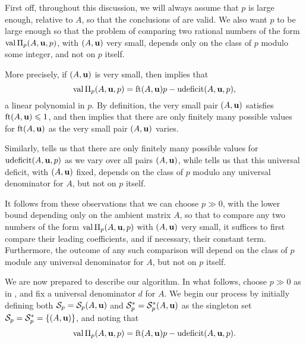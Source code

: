 \documentclass[11pt]{amsart}
\newcommand{\udeficit}{\operatorname{udeficit}}
\newcommand{\denom}{d}
\renewcommand{\S}{\mathcal{S}}
\begin{document}
\begin{remark}
   \label{p large m-primary: R}
   First off, throughout this discussion, we will always assume that $p$ is large enough, relative to $A$, so that the conclusions of  are valid.
   We also want $p$ to be large enough so that the problem of comparing two rational numbers of the form $\operatorname{val} \Pi_p(A,\mathbf{u},p)$, with $(A,\mathbf{u})$ very small, depends only on the class of $p$ modulo some integer, and not on $p$ itself.

   More precisely, if $(A,\mathbf{u})$ is very small, then   implies that
   \[ \val \IP_p(A,\vv{u},p) = \ft{A}{\vv{u}}p-\udeficit(A,\vv{u},p), \]
   a linear polynomial in $p$.
   By definition, the very small pair $(A,\mathbf{u})$ satisfies $\operatorname{ft}(A, \mathbf{u}) \leqslant 1$, and  then implies that there are only finitely many possible values for $\operatorname{ft}(A, \mathbf{u})$ as the very small pair $(A,\mathbf{u})$ varies.

   Similarly,  tells us that there are only finitely many possible values for $\udeficit(A,\vv{u},p)$ as we vary over all pairs $(A,\mathbf{u})$, while  tells us that this universal deficit, with $(A,\mathbf{u})$ fixed, depends on the class of $p$ modulo any universal denominator for $A$, but not on $p$ itself.

   It follows from these observations that we can choose $p \gg 0$, with the lower bound depending only on the ambient matrix $A$, so that to compare any two numbers of the form $\operatorname{val} \Pi_p(A,\mathbf{u},p)$ with $(A,\mathbf{u})$ very small, it suffices to first compare their leading coefficients, and if necessary, their constant term.
   Furthermore, the outcome of any such comparison will depend on the class of $p$ module any universal denominator for $A$, but not on $p$ itself.
\end{remark}


We are now prepared to describe our algorithm.
In what follows, choose $p \gg 0$ as in , and fix a universal denominator  $\denom$ for $A$.
We begin our process by initially defining both $\S_p = \S_p(A,\vv{u})$ and $\S^{\ast}_p = \S^{\ast}_p(A,\vv{u})$ as the singleton set $\S_p=\S_p^{\ast} = \{ (A,\vv{u}) \}$,  and noting that 
\[ \val \IP_p(A,\vv{u},p) = \ft{A}{\vv{u}}p-\udeficit(A,\vv{u},p).\]
\end{document}
